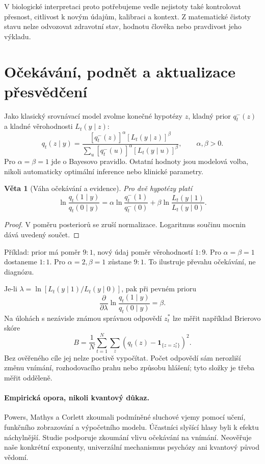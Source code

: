 \documentclass[11pt,a4paper]{article}
\newtheorem{theorem}{Věta}
\begin{document}
V biologické interpretaci proto potřebujeme vedle nejistoty také kontrolovat přesnost, citlivost k novým údajům, kalibraci a kontext. Z matematické čistoty stavu nelze odvozovat zdravotní stav, hodnotu člověka nebo pravdivost jeho výkladu.

\newpage
\section{Očekávání, podnět a aktualizace přesvědčení}
Jako klasický srovnávací model zvolme konečné hypotézy $z$, kladný prior $q_t^-(z)$ a kladné věrohodnosti $L_t(y\mid z)$:
\[
q_t(z\mid y)=
\frac{[q_t^-(z)]^\alpha[L_t(y\mid z)]^\beta}
{\sum_u[q_t^-(u)]^\alpha[L_t(y\mid u)]^\beta},
\qquad \alpha,\beta>0.
\]
Pro $\alpha=\beta=1$ jde o Bayesovo pravidlo. Ostatní hodnoty jsou modelová volba, nikoli automaticky optimální inference nebo klinické parametry.

\begin{theorem}[Váha očekávání a evidence]
Pro dvě hypotézy platí
\[
\ln\frac{q_t(1\mid y)}{q_t(0\mid y)}
=\alpha\ln\frac{q_t^-(1)}{q_t^-(0)}
+\beta\ln\frac{L_t(y\mid1)}{L_t(y\mid0)}.
\]
\end{theorem}
\begin{proof}
V poměru posteriorů se zruší normalizace. Logaritmus součinu mocnin dává uvedený součet.
\end{proof}
Příklad: prior má poměr $9:1$, nový údaj poměr věrohodností $1:9$.
Pro $\alpha=\beta=1$ dostaneme $1:1$. Pro $\alpha=2,\beta=1$ zůstane $9:1$. To ilustruje převahu očekávání, ne diagnózu.

Je-li $\lambda=\ln[L_t(y\mid1)/L_t(y\mid0)]$,
pak při pevném prioru
\[
\frac{\partial}{\partial\lambda}\ln\frac{q_t(1\mid y)}{q_t(0\mid y)}=\beta.
\]
Na úlohách s nezávisle známou správnou odpovědí $z_t^*$ lze měřit například Brierovo skóre
\[
B=\frac1N\sum_{t=1}^N\sum_z
\left(q_t(z)-\mathbf 1_{\{z=z_t^*\}}\right)^2.
\]
Bez ověřeného cíle jej nelze poctivě vypočítat.
Počet odpovědí sám nerozliší změnu vnímání, rozhodovacího prahu nebo způsobu hlášení; tyto složky je třeba měřit odděleně.

\paragraph{Empirická opora, nikoli kvantový důkaz.}
Powers, Mathys a Corlett \cite{powers} zkoumali podmíněné sluchové vjemy pomocí učení, funkčního zobrazování a výpočetního modelu. Účastníci slyšící hlasy byli k efektu náchylnější. Studie podporuje zkoumání vlivu očekávání na vnímání. Neověřuje naše konkrétní exponenty, univerzální mechanismus psychózy ani kvantový původ vědomí.
\end{document}
